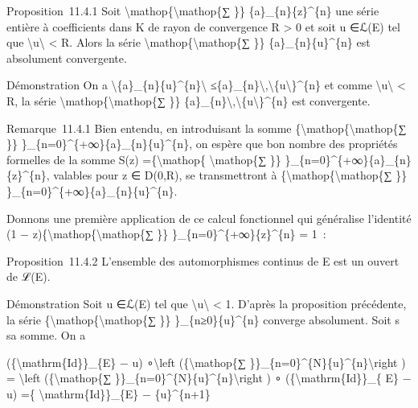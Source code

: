 \documentclass[]{article}
\begin{document}
Proposition~11.4.1 Soit
\textbackslash{}mathop\{\textbackslash{}mathop\{∑ \}\}
\{a\}\_\{n\}\{z\}\^{}\{n\} une série entière à coefficients dans K de
rayon de convergence R \textgreater{} 0 et soit u ∈ℒ(E) tel que
\textbackslash{}\textbar{}u\textbackslash{}\textbar{} \textless{} R.
Alors la série \textbackslash{}mathop\{\textbackslash{}mathop\{∑ \}\}
\{a\}\_\{n\}\{u\}\^{}\{n\} est absolument convergente.

Démonstration On a
\textbackslash{}\textbar{}\{a\}\_\{n\}\{u\}\^{}\{n\}\textbackslash{}\textbar{}
≤\textbar{}\{a\}\_\{n\}\textbar{}\textbackslash{},\textbackslash{}\textbar{}\{u\textbackslash{}\textbar{}\}\^{}\{n\}
et comme \textbackslash{}\textbar{}u\textbackslash{}\textbar{}
\textless{} R, la série
\textbackslash{}mathop\{\textbackslash{}mathop\{∑ \}\}
\textbar{}\{a\}\_\{n\}\textbar{}\textbackslash{},\textbackslash{}\textbar{}\{u\textbackslash{}\textbar{}\}\^{}\{n\}
est convergente.

Remarque~11.4.1 Bien entendu, en introduisant la somme
\{\textbackslash{}mathop\{\textbackslash{}mathop\{∑ \}\}
\}\_\{n=0\}\^{}\{+∞\}\{a\}\_\{n\}\{u\}\^{}\{n\}, on espère que bon
nombre des propriétés formelles de la somme S(z)
=\{\textbackslash{}mathop\{ \textbackslash{}mathop\{∑ \}\}
\}\_\{n=0\}\^{}\{+∞\}\{a\}\_\{n\}\{z\}\^{}\{n\}, valables pour z ∈
D(0,R), se transmettront à
\{\textbackslash{}mathop\{\textbackslash{}mathop\{∑ \}\}
\}\_\{n=0\}\^{}\{+∞\}\{a\}\_\{n\}\{u\}\^{}\{n\}.

Donnons une première application de ce calcul fonctionnel qui généralise
l'identité (1 − z)\{\textbackslash{}mathop\{\textbackslash{}mathop\{∑
\}\} \}\_\{n=0\}\^{}\{+∞\}\{z\}\^{}\{n\} = 1~:

Proposition~11.4.2 L'ensemble des automorphismes continus de E est un
ouvert de ℒ(E).

Démonstration Soit u ∈ℒ(E) tel que
\textbackslash{}\textbar{}u\textbackslash{}\textbar{} \textless{} 1.
D'après la proposition précédente, la série
\{\textbackslash{}mathop\{\textbackslash{}mathop\{∑ \}\}
\}\_\{n≥0\}\{u\}\^{}\{n\} converge absolument. Soit s sa somme. On a

(\{\textbackslash{}mathrm\{Id\}\}\_\{E\} − u) ∘\textbackslash{}left
(\{\textbackslash{}mathop\{∑
\}\}\_\{n=0\}\^{}\{N\}\{u\}\^{}\{n\}\textbackslash{}right ) =
\textbackslash{}left (\{\textbackslash{}mathop\{∑
\}\}\_\{n=0\}\^{}\{N\}\{u\}\^{}\{n\}\textbackslash{}right ) ∘
(\{\textbackslash{}mathrm\{Id\}\}\_\{ E\} − u) =\{
\textbackslash{}mathrm\{Id\}\}\_\{E\} − \{u\}\^{}\{n+1\}
\end{document}
